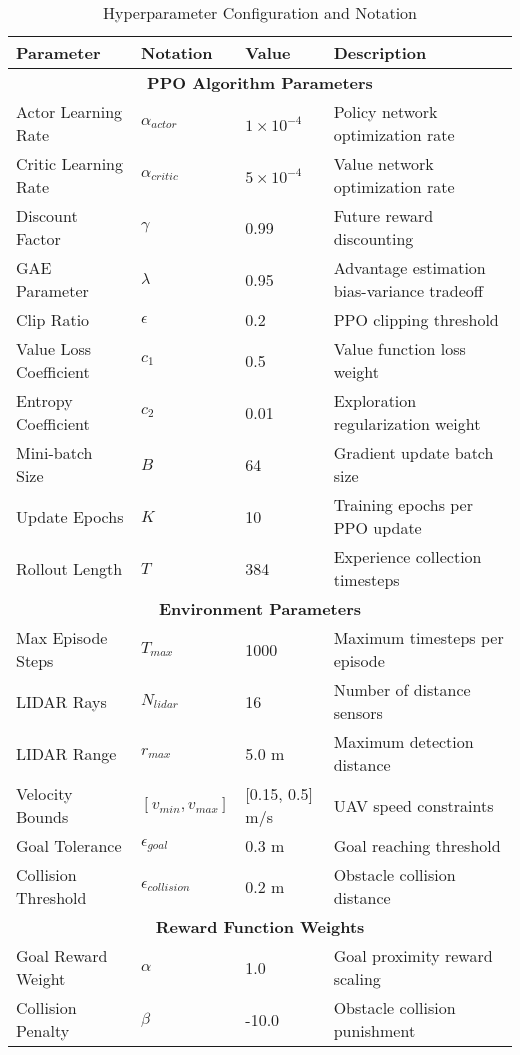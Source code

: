 \documentclass[pdflatex,sn-mathphys-num]{sn-jnl}
\theoremstyle{thmstyleone}%
\theoremstyle{thmstyletwo}%
\theoremstyle{thmstylethree}%
\begin{document}
\begin{table}[h]
\centering
\caption{Hyperparameter Configuration and Notation}
\begin{tabular}{llll}
\hline
\textbf{Parameter} & \textbf{Notation} & \textbf{Value} & \textbf{Description} \\
\hline
\multicolumn{4}{c}{\textbf{PPO Algorithm Parameters}} \\
\hline
Actor Learning Rate & $\alpha_{actor}$ & $1 \times 10^{-4}$ & Policy network optimization rate \\
Critic Learning Rate & $\alpha_{critic}$ & $5 \times 10^{-4}$ & Value network optimization rate \\
Discount Factor & $\gamma$ & 0.99 & Future reward discounting \\
GAE Parameter & $\lambda$ & 0.95 & Advantage estimation bias-variance tradeoff \\
Clip Ratio & $\epsilon$ & 0.2 & PPO clipping threshold \\
Value Loss Coefficient & $c_1$ & 0.5 & Value function loss weight \\
Entropy Coefficient & $c_2$ & 0.01 & Exploration regularization weight \\
Mini-batch Size & $B$ & 64 & Gradient update batch size \\
Update Epochs & $K$ & 10 & Training epochs per PPO update \\
Rollout Length & $T$ & 384 & Experience collection timesteps \\
\hline
\multicolumn{4}{c}{\textbf{Environment Parameters}} \\
\hline
Max Episode Steps & $T_{max}$ & 1000 & Maximum timesteps per episode \\
LIDAR Rays & $N_{lidar}$ & 16 & Number of distance sensors \\
LIDAR Range & $r_{max}$ & 5.0 m & Maximum detection distance \\
Velocity Bounds & $[v_{min}, v_{max}]$ & [0.15, 0.5] m/s & UAV speed constraints \\
Goal Tolerance & $\epsilon_{goal}$ & 0.3 m & Goal reaching threshold \\
Collision Threshold & $\epsilon_{collision}$ & 0.2 m & Obstacle collision distance \\
\hline
\multicolumn{4}{c}{\textbf{Reward Function Weights}} \\
\hline
Goal Reward Weight & $\alpha$ & 1.0 & Goal proximity reward scaling \\
Collision Penalty & $\beta$ & -10.0 & Obstacle collision punishment \\

\end{tabular}
\end{table}
\end{document}

